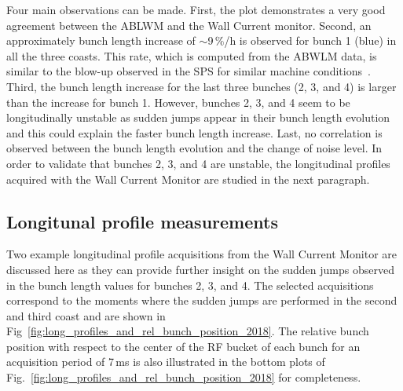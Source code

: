 Four main observations can be made. First, the plot demonstrates a very good agreement between the ABLWM and the Wall Current monitor. Second, an approximately bunch length increase of $\sim$9\,$\%$/h is observed for bunch 1 (blue) in all the three coasts. This rate, which is computed from the ABWLM data, is similar to the blow-up observed in the SPS for similar machine conditions~\cite{Alekou_CC_coast_prep_2016}. Third, the bunch length increase for the last three bunches (2, 3, and 4) is larger than the increase for bunch 1. However, bunches 2, 3, and 4 seem to be longitudinally unstable as sudden jumps appear in their bunch length evolution and this could explain the faster bunch length increase. Last, no correlation is observed between the bunch length evolution and the change of noise level. In order to validate that bunches 2, 3, and 4 are unstable, the longitudinal profiles acquired with the Wall Current Monitor are studied in the next paragraph. 

\subsection{Longitunal profile measurements}\label{subsec:long_profiles_meas_2018}
Two example longitudinal profile acquisitions from the Wall Current Monitor are discussed here as they can provide further insight on the sudden jumps observed in the bunch length values for bunches 2, 3, and 4. The selected acquisitions correspond to the moments where the sudden jumps are performed in the second and third coast and are shown in Fig~\ref{fig:long_profiles_and_rel_bunch_position_2018}. The relative bunch position with respect to the center of the RF bucket of each bunch for an acquisition period of 7\,ms is also illustrated in the bottom plots of Fig.~\ref{fig:long_profiles_and_rel_bunch_position_2018} for completeness. 


